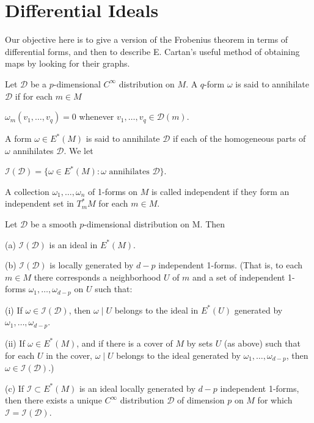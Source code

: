 \section{Differential Ideals}


Our objective here is to give a version of the Frobenius theorem in terms of differential forms, and then to describe E. Cartan's useful method of obtaining maps by looking for their graphs.

\begin{definition}\label{thm:2.26}
Let $\mathcal{D}$ be a $p$-dimensional $C^{\infty}$ distribution on $M$. A $q$-form $\omega$ is said to annihilate $\mathcal{D}$ if for each $m\in M$

$ \omega_m(v_1, \ldots, v_q) = 0 $ whenever  $ v_1, \ldots, v_q \in \mathcal{D}(m) $.

A form  $ \omega \in E^*(M) $ is said to annihilate  $ \mathcal{D} $ if each of the homogeneous parts of  $ \omega $ annihilates  $ \mathcal{D} $. We let

$ \mathcal{I}(\mathcal{D}) = \{\omega \in E^*(M)\colon \omega \text{ annihilates } \mathcal{D}\}. $

\end{definition}

\begin{definition}\label{thm:2.27}
A collection  $ \omega_1, \ldots, \omega_n $ of 1-forms on  $ M $ is called independent if they form an independent set in  $ T_{m}^{*} M $ for each  $ m \in M $.

\end{definition}

\begin{proposition}\label{thm:2.28}
Let $\mathcal{D}$ be a smooth $p$-dimensional distribution on M. Then

(a)  $ \mathcal{I}(\mathcal{D}) $ is an ideal in  $ E^{*}(M) $.

(b) $\mathcal{I}(\mathcal{D})$ is locally generated by $d-p$ independent 1-forms. (That is, to each $m\in M$ there corresponds a neighborhood $U$ of $m$ and a set of independent 1-forms $\omega_{1},\ldots,\omega_{d-p}$ on $U$ such that:

(i) If $\omega \in \mathcal{I}(\mathcal{D})$, then $\omega \mid U$ belongs to the ideal in $E^{*}(U)$ generated by $\omega_1, \ldots, \omega_{d-p}$.

(ii) If $\omega \in E^*(M)$, and if there is a cover of $M$ by sets $U$ (as above) such that for each $U$ in the cover, $\omega \mid U$ belongs to the ideal generated by $\omega_1, \ldots, \omega_{d-p}$, then $\omega \in \mathcal{I}(\mathcal{D})$.)

(c) If $\mathcal{I} \subset E^{*}(M)$ is an ideal locally generated by $d - p$ independent 1-forms, then there exists a unique $C^{\infty}$ distribution $\mathcal{D}$ of dimension $p$ on $M$ for which $\mathcal{I} = \mathcal{I}(\mathcal{D})$.

\end{proposition}


